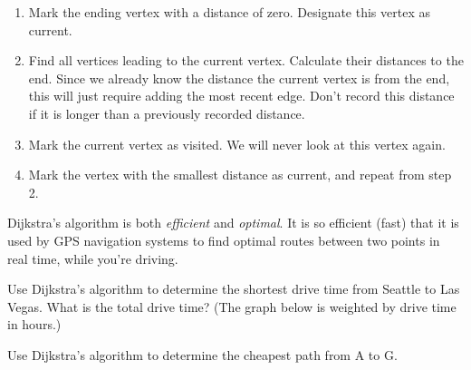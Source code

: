 \begin{algorithm}
  \begin{enumerate}
  \item Mark the ending vertex with a distance of zero. Designate this
    vertex as current.

  \item Find all vertices leading to the current vertex. Calculate
    their distances to the end. Since we already know the distance the
    current vertex is from the end, this will just require adding the
    most recent edge. Don't record this distance if it is longer than
    a previously recorded distance.

  \item Mark the current vertex as visited. We will never look at this
    vertex again.

  \item Mark the vertex with the smallest distance as current, and
    repeat from step 2.
  \end{enumerate}
\end{algorithm}

\begin{note}
  Dijkstra's algorithm is both \emph{efficient} and \emph{optimal}. It
  is so efficient (fast) that it is used by GPS navigation systems to
  find optimal routes between two points in real time, \ie{} while
  you're driving.
\end{note}

\newpage

\begin{exercise}
  Use Dijkstra's algorithm to determine the shortest drive time from
  Seattle to Las Vegas. What is the total drive time? (The graph below
  is weighted by drive time in hours.)

  \bigskip

  

\end{exercise}

\newpage

\begin{exercise}
  Use Dijkstra's algorithm to determine the cheapest path from
  A to G.

  \bigskip

  

\end{exercise}

